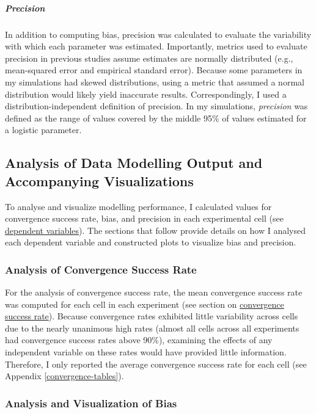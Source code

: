 \documentclass[
12pt, %
twoside,
english]{guelphthesis}
\begin{document}
\hypertarget{pres-precision}{%
\subparagraph{Precision}\label{pres-precision}}

In addition to computing bias, precision was calculated to evaluate the variability with which each parameter was estimated. Importantly, metrics used to evaluate precision in previous studies assume estimates are normally distributed (e.g., mean-squared error and empirical standard error). Because some parameters in my simulations had skewed distributions, using a metric that assumed a normal distribution would likely yield inaccurate results. Correspondingly, I used a distribution-independent definition of precision. In my simulations, \emph{precision} was defined as the range of values covered by the middle 95\% of values estimated for a logistic parameter.

\hypertarget{analysis-visualization}{%
\subsection{Analysis of Data Modelling Output and Accompanying Visualizations}\label{analysis-visualization}}

To analyse and visualize modelling performance, I calculated values for convergence success rate, bias, and precision in each experimental cell (see \protect\hyperlink{dependent-variables}{dependent variables}). The sections that follow provide details on how I analysed each dependent variable and constructed plots to visualize bias and precision.

\hypertarget{convergence-analysis}{%
\subsubsection{Analysis of Convergence Success Rate}\label{convergence-analysis}}

For the analysis of convergence success rate, the mean convergence success rate was computed for each cell in each experiment (see section on \protect\hyperlink{convergence}{convergence success rate}). Because convergence rates exhibited little
variability across cells due to the nearly unanimous high rates (almost all cells across all experiments had convergence success rates above 90\%), examining the effects of any independent variable on these rates would have provided little information. Therefore, I only reported the average convergence success rate for each cell (see Appendix \ref{convergence-tables}).

\hypertarget{bias-analysis}{%
\subsubsection{Analysis and Visualization of Bias}\label{bias-analysis}}
\end{document}
